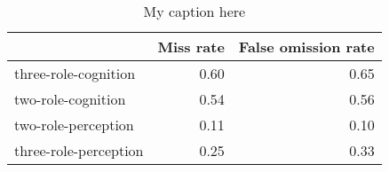 \begin{table}[!ht]
\centering
\begin{tabular}{lrr}
\toprule
{} &  Miss rate &  False omission rate \\
\midrule
three-role-cognition  &       0.60 &                 0.65 \\
two-role-cognition    &       0.54 &                 0.56 \\
two-role-perception   &       0.11 &                 0.10 \\
three-role-perception &       0.25 &                 0.33 \\
\bottomrule
\end{tabular}
\caption{My caption here}
\label{tab:MENTAL-oe-combined-errors}
\end{table}